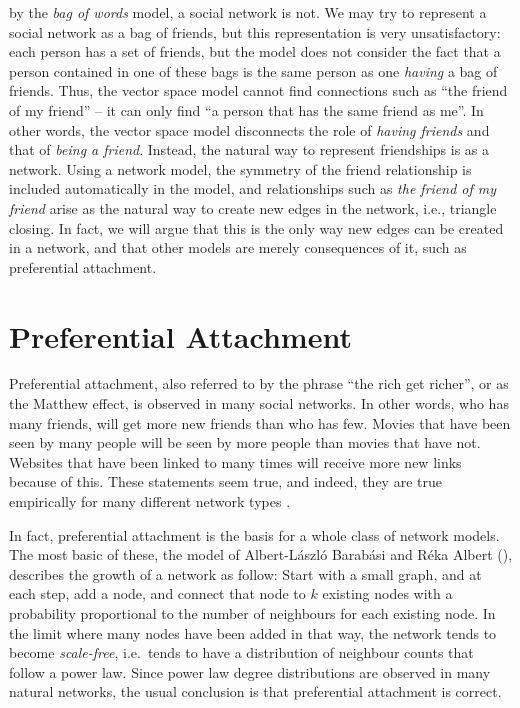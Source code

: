 \documentclass{jimis}
\begin{document}
by the \emph{bag of words} model, a social network is not.  We may try to
represent a social network as a bag of friends, but this
representation is very unsatisfactory:  each person has a set of
friends, but the model does not consider the fact that a person
contained in one of these bags is the same person as one
\emph{having} a bag of friends.  Thus, the vector space model cannot
find connections such as ``the friend of my friend'' -- it can only find
``a person that has the same friend as me''.  In other words, the vector
space model disconnects the role of \emph{having friends} and that of
\emph{being a friend}.  Instead, the natural way to represent
friendships is as a network.  Using a network model, the symmetry of the
friend relationship is included automatically in the model, and
relationships such as \emph{the friend of my friend} arise as the
natural way to create new edges in the network, i.e., triangle closing.
In fact, we will argue that this is the only way new edges can be created in a network, and
that other models are merely consequences of it, such as preferential
attachment. 

\section{Preferential Attachment}
Preferential attachment, also referred to by the phrase ``the rich get
richer'', or as the Matthew effect,
is observed in many social networks.  In other words,
who has many friends, will get more new friends than who has few.  Movies
that have been seen by many people will be seen by more people than
movies that have not.  Websites that have been linked to many times will
receive more new links because of this.  These statements seem true, and
indeed, they are true empirically for many different network types
\citep{kunegis:preferential-attachment}. 

In fact, preferential attachment is the basis for a whole class of
network models.  The most basic of these, the model of Albert-László
Barabási and Réka Albert (\citeyear{barabasi-albert}), describes the growth of a network
as follow:  Start with a small graph, and at each step, add a node, and
connect that node to $k$ existing nodes with a probability proportional
to the number of neighbours for each existing node.  In the limit where
many nodes have been added in that way, the network tends to become
\emph{scale-free}, i.e.\ tends to have a distribution of neighbour counts
that follow a power law.  Since power law degree
distributions are observed in many natural networks, the usual conclusion
is that preferential attachment is correct. 
\end{document}
